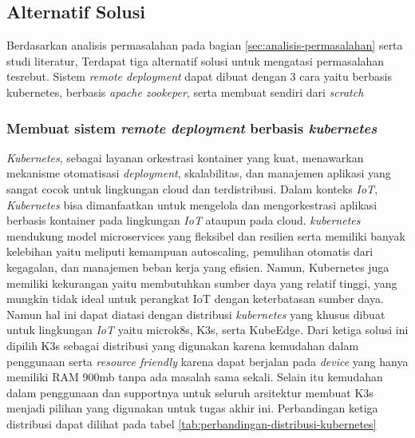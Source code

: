 \subsection{Alternatif Solusi}
\label{sec:analisis-solusi}

Berdasarkan analisis permasalahan pada bagian \ref{sec:analisis-permasalahan} serta studi literatur, Terdapat tiga alternatif solusi untuk mengatasi permasalahan tesrebut. Sistem \textit{remote deployment} dapat dibuat dengan 3 cara yaitu berbasis kubernetes, berbasis \textit{apache zookeper}, serta membuat sendiri dari \textit{scratch}

\subsubsection{Membuat sistem \textit{remote deployment} berbasis \textit{kubernetes}}
\textit{Kubernetes}, sebagai layanan orkestrasi kontainer yang kuat, menawarkan mekanisme otomatisasi \textit{deployment}, skalabilitas, dan manajemen aplikasi yang sangat cocok untuk lingkungan cloud dan terdistribusi. Dalam konteks \textit{IoT}, \textit{Kubernetes} bisa dimanfaatkan untuk mengelola dan mengorkestrasi aplikasi berbasis kontainer pada lingkungan \textit{IoT} ataupun pada cloud. \textit{kubernetes} mendukung model microservices yang fleksibel dan resilien serta memiliki banyak kelebihan yaitu  meliputi kemampuan autoscaling, pemulihan otomatis dari kegagalan, dan manajemen beban kerja yang efisien. Namun, Kubernetes juga memiliki kekurangan yaitu membutuhkan sumber daya yang relatif tinggi, yang mungkin tidak ideal untuk perangkat IoT dengan keterbatasan sumber daya. Namun hal ini dapat diatasi dengan distribusi \textit{kubernetes} yang khusus dibuat untuk lingkungan \textit{IoT} yaitu microk8s, K3s, serta KubeEdge. Dari ketiga solusi ini dipilih K3s sebagai distribusi yang digunakan karena kemudahan dalam penggunaan serta \textit{resource friendly} karena dapat berjalan pada \textit{device} yang hanya memiliki RAM 900mb tanpa ada masalah sama sekali. Selain itu kemudahan dalam penggunaan dan supportnya untuk seluruh arsitektur membuat K3s menjadi pilihan yang digunakan untuk tugas akhir ini. Perbandingan ketiga distribusi dapat dilihat pada tabel \ref{tab:perbandingan-distribusi-kubernetes}

